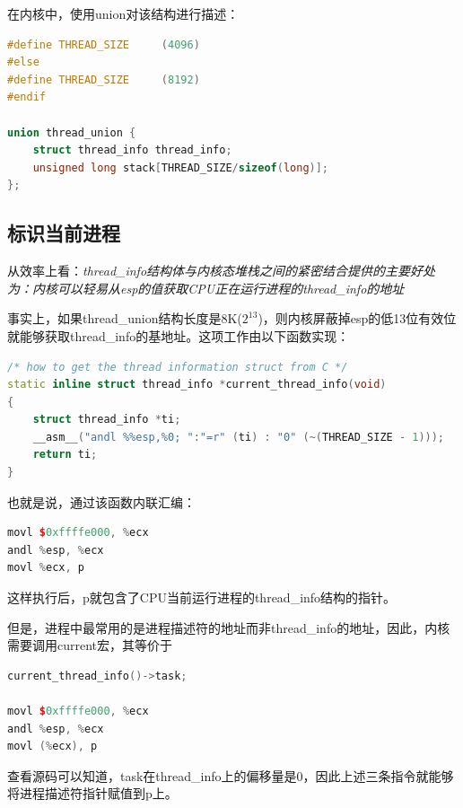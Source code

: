     在内核中，使用union对该结构进行描述：

\begin{lstlisting}[language=C++]
#define THREAD_SIZE     (4096)
#else
#define THREAD_SIZE		(8192)
#endif

union thread_union {
    struct thread_info thread_info;
    unsigned long stack[THREAD_SIZE/sizeof(long)];
};
\end{lstlisting}

\subsection{标识当前进程}

    从效率上看：\emph{thread\_info结构体与内核态堆栈之间的紧密结合提供的主要好处为：内核可以轻易从esp的值获取CPU正在运行进程的thread\_info的地址}

    事实上，如果thread\_union结构长度是8K($2^{13}$)，则内核屏蔽掉esp的低13位有效位就能够获取thread\_info的基地址。这项工作由以下函数实现：

\begin{lstlisting}[language=C++]
/* how to get the thread information struct from C */
static inline struct thread_info *current_thread_info(void)
{
    struct thread_info *ti;
    __asm__("andl %%esp,%0; ":"=r" (ti) : "0" (~(THREAD_SIZE - 1)));
    return ti;
}
\end{lstlisting}

    也就是说，通过该函数内联汇编：

\begin{lstlisting}[language=C++]
movl $0xffffe000, %ecx
andl %esp, %ecx
movl %ecx, p
\end{lstlisting}

    这样执行后，p就包含了CPU当前运行进程的thread\_info结构的指针。

    但是，进程中最常用的是进程描述符的地址而非thread\_info的地址，因此，内核需要调用current宏，其等价于

\begin{lstlisting}[language=C++]
current_thread_info()->task;

movl $0xffffe000, %ecx
andl %esp, %ecx
movl (%ecx), p
\end{lstlisting}

    查看源码可以知道，task在thread\_info上的偏移量是0，因此上述三条指令就能够将进程描述符指针赋值到p上。

    
